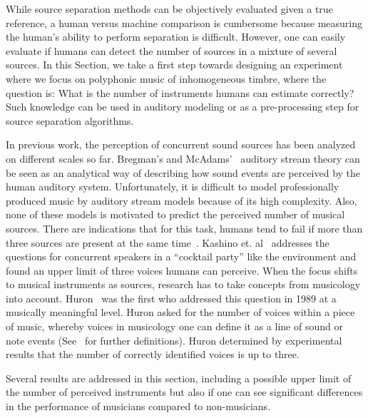 While source separation methods can be objectively evaluated given a true reference, a human versus machine comparison is cumbersome because measuring the human's ability to perform separation is difficult. However, one can easily evaluate if humans can detect the number of sources in a mixture of several sources.
In this Section, we take a first step towards designing an experiment where we focus on polyphonic music of inhomogeneous timbre, where the question is: What is the number of instruments humans can estimate correctly?
Such knowledge can be used in auditory modeling or as a pre-processing step for source separation algorithms.
\par
In previous work, the perception of concurrent sound sources has been analyzed on different scales so far. 
Bregman's and McAdams'~\cite{mcadams89} auditory stream theory can be seen as an analytical way of describing how sound events are perceived by the human auditory system. 
Unfortunately, it is difficult to model professionally produced music by auditory stream models because of its high complexity.
Also, none of these models is motivated to predict the perceived number of musical sources. 
There are indications that for this task, humans tend to fail if more than three sources are present at the same time~\cite{huron89}.
Kashino et. al~\cite{kashino96} addresses the questions for concurrent speakers in a ``cocktail party'' like the environment and found an upper limit of three voices humans can perceive. 
When the focus shifts to musical instruments as sources, research has to take concepts from musicology into account. 
Huron~\cite{huron89} was the first who addressed this question in 1989 at a musically meaningful level.
Huron asked for the number of voices within a piece of music, whereby voices in musicology one can define it as a line of sound or note events (See~\cite{Cambouropoulos2008} for further definitions).
Huron determined by experimental results that the number of correctly identified voices is up to three.
\par
Several results are addressed in this section, including a possible upper limit of the number of perceived instruments but also if one can see significant differences in the performance of musicians compared to non-musicians.

